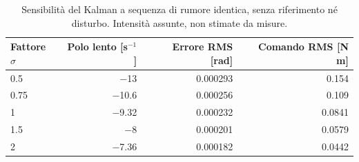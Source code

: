 \begin{table}[htbp]\centering\small
\setlength{\tabcolsep}{4pt}
\begin{tabular}{lrrr}\toprule
Fattore $\sigma$ & Polo lento [s$^{-1}$] & Errore RMS [rad] & Comando RMS [N m]\\\midrule
\num{0.5} & \num{-13} & \num{0.000293} & \num{0.154}\\
\num{0.75} & \num{-10.6} & \num{0.000256} & \num{0.109}\\
\num{1} & \num{-9.32} & \num{0.000232} & \num{0.0841}\\
\num{1.5} & \num{-8} & \num{0.000201} & \num{0.0579}\\
\num{2} & \num{-7.36} & \num{0.000182} & \num{0.0442}\\
\bottomrule\end{tabular}
\caption{Sensibilità del Kalman a sequenza di rumore identica, senza riferimento né disturbo. Intensità assunte, non stimate da misure.}
\end{table}

